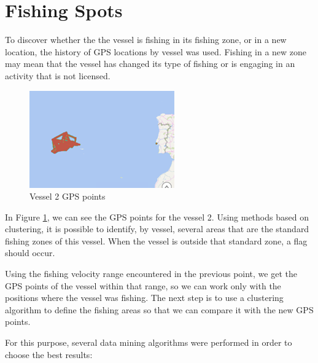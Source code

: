 \section{Fishing Spots} %
\label{sub:fishing_spots}

To discover whether the
the vessel is fishing in its fishing zone, or in a new location, the history of GPS locations by vessel was used.
Fishing in a new zone may mean that the vessel has changed its type of fishing or is engaging in an activity that is not licensed.


\begin{figure}[]
\centering
\includegraphics[width=0.8\linewidth]{Chapters/img/gps_vessel2.png}
\caption{Vessel 2 GPS points}
\label{fig:gps_vessel2}
\end{figure}

In Figure \ref{fig:gps_vessel2}, we can see the GPS points for the vessel 2. Using methods based on clustering, it is possible to identify, by vessel, several areas that are the standard fishing zones of this vessel. When the vessel is outside that standard zone, a flag should occur.

Using the fishing velocity range encountered in the previous point, we get the GPS points of the vessel within that range, so we can work only with the positions where the vessel was fishing. The next step is to use a clustering algorithm to define the fishing areas so that we can compare it with the new GPS points. 

For this purpose, several data mining algorithms were performed in order to choose the best results:

